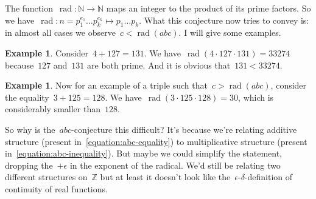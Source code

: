 \documentclass[11pt, a4paper, openany, oneside, article]{memoir}
\theoremstyle{definition}
\newtheorem{example}[theorem]{Example}
\DeclareMathOperator\rad{rad}
\begin{document}
The function~$\rad\colon\mathbb{N}\to\mathbb{N}$ maps an integer to the product of its prime factors. So we have~$\rad\colon n=p_1^{e_1}\ldots p_k^{e_k}\mapsto p_1\ldots p_k$. What this conjecture now tries to convey is: in almost all cases we observe~$c<\rad(abc)$. I will give some examples.

\begin{example}
  \label{example:abc-1}
  Consider~$4+127=131$. We have~$\rad(4\cdot 127\cdot 131)=33274$ because~$127$ and~$131$ are both prime. And it is obvious that~$131<33274$.
\end{example}

\begin{example}
  \label{example:abc-2}
  Now for an example of a triple such that~$c>\rad(abc)$, consider the equality~$3+125=128$. We have~$\rad(3\cdot 125\cdot 128)=30$, which is considerably smaller than~$128$.
\end{example}

So why is the~$abc$\nobreakdash-conjecture this difficult? It's because we're relating additive structure (present in~\eqref{equation:abc-equality}) to multiplicative structure (present in~\eqref{equation:abc-inequality}). But maybe we could simplify the statement, dropping the~$+\epsilon$ in the exponent of the radical. We'd still be relating two different structures on~$\mathbb{Z}$ but at least it doesn't look like the~$\epsilon$-$\delta$-definition of continuity of real functions.
\end{document}
